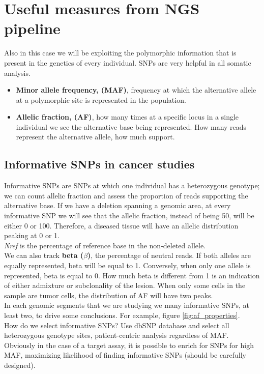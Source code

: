 
\section{Useful measures from NGS pipeline}
Also in this case we will be exploiting the polymorphic information that is present in the genetics of every individual. SNPs are very helpful in all somatic analysis.
\begin{itemize}
\item \textbf{Minor allele frequency, (MAF)}, frequency at which the alternative allele at a polymorphic site is represented in the population.
\item \textbf{Allelic fraction, (AF)}, how many times at a specific locus in a single individual we see the alternative base being represented. How many reads represent the alternative allele, how much support.
\end{itemize}

\subsection{Informative SNPs in cancer studies}
Informative SNPs are SNPs at which one individual has a heterozygous genotype; we can count allelic fraction and assess the proportion of reads supporting the alternative base.
If we have a deletion spanning a genomic area, at every informative SNP we will see that the allelic fraction, instead of being 50, will be either 0 or 100. Therefore, a diseased tissue will have an allelic distribution peaking at 0 or 1.
\\
\textit{Nref} is the percentage of reference base in the non-deleted allele.
\\
We can also track \textbf{beta ($\beta$)}, the percentage of neutral reads. If both alleles are equally represented, beta will be equal to 1.
Conversely, when only one allele is represented, beta is equal to 0.
How much beta is different from 1 is an indication of either admixture or subclonality of the lesion.
When only some cells in the sample are tumor cells, the distribution of AF will have two peaks.
\\
In each genomic segments that we are studying we many informative SNPs, at least two, to drive some conclusions. For example, figure \ref{fig:af_properties}.\\
How do we select informative SNPs? Use dbSNP database and select all heterozygous genotype sites, patient-centric analysis regardless of MAF. Obviously in the case of a target assay, it is possible to enrich for SNPs for high MAF, maximizing likelihood of finding informative SNPs (should be carefully designed).

